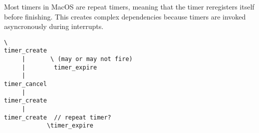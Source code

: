 Most timers in MacOS are repeat timers, meaning that the timer reregisters itself before finishing.
This creates complex dependencies because timers are invoked asyncronously during interrupts.

{\footnotesize \begin{verbatim}
\
timer_create
     |       \ (may or may not fire)
     |        timer_expire
     |
timer_cancel
     |
timer_create
     |
timer_create  // repeat timer?
            \timer_expire

\end{verbatim}
}
